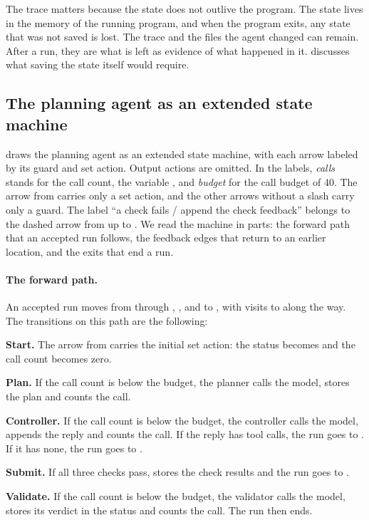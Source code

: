 The trace matters because the state does not outlive the program. The state lives in the memory of
the running program, and when the program exits, any state that was not saved is lost. The trace and
the files the agent changed can remain. After a run, they are what is left as evidence of what
happened in it.  discusses what saving the state itself would require.

\subsection{The planning agent as an extended state machine}
\label{sec:machines-planning}

 draws the planning agent as an extended state machine, with each arrow
labeled by its guard and set action. Output actions are omitted. In the labels, \emph{calls} stands
for the call count, the variable , and \emph{budget} for the call budget of 40.
The arrow from  carries only a set action, and the other arrows without a slash carry
only a guard. The label ``a check fails / append the check feedback'' belongs to the dashed arrow
from  up to . We read the machine in parts: the forward path that
an accepted run follows, the feedback edges that return to an earlier location, and the exits that
end a run.

\paragraph{The forward path.}
An accepted run moves from  through , ,
 and  to , with visits to  along the
way. The transitions on this path are the following:
\be
\item \textbf{Start.} The arrow from  carries the initial set action: the status
becomes  and the call count becomes zero.
\item \textbf{Plan.} If the call count is below the budget, the planner calls the model, stores the
plan and counts the call.
\item \textbf{Controller.} If the call count is below the budget, the controller calls the model,
appends the reply and counts the call. If the reply has tool calls, the run goes to
. If it has none, the run goes to .
\item \textbf{Submit.} If all three checks pass,  stores the check results and the
run goes to .
\item \textbf{Validate.} If the call count is below the budget, the validator calls the model, stores
its verdict in the status and counts the call. The run then ends.
\ee

